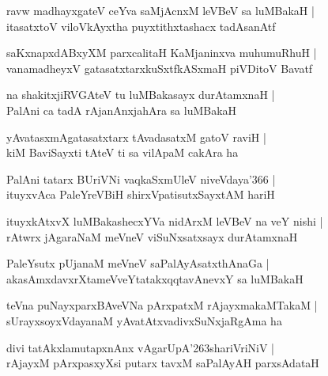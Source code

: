 \documentclass[twoside,12pt,openright]{book}
\def\S{\char'263}
\newcounter{shloka}[chapter]
\begin{document}
\begin{shloka}%
ravw madhayxgateV ceYva saMjAcnxM leVBeV sa luMBakaH |\\
itasatxtoV viloVkAyxtha puyxtithxtashacx tadAsanAtf
\end{shloka}

\begin{shloka}%
saKxnapxdABxyXM parxcalitaH KaMjaninxva muhumuRhuH |\\
vanamadheyxV gatasatxtarxkuSxtfkASxmaH piVDitoV Bavatf
\end{shloka}

\begin{shloka}%
na shakitxjiRVGAteV tu luMBakasayx durAtamxnaH |\\
PalAni ca tadA rAjanAnxjahAra sa luMBakaH
\end{shloka}

\begin{shloka}%
yAvatasxmAgatasatxtarx tAvadasatxM gatoV raviH |\\
kiM BaviSayxti tAteV ti sa vilApaM cakAra ha
\end{shloka}

\begin{shloka}%
PalAni tatarx BUriVNi vaqkaSxmUleV niveVdaya\char'366 |\\
ituyxvAca PaleYreVBiH shirxVpatisutxSayxtAM hariH 
\end{shloka}

\begin{shloka}%
ituyxkAtxvX luMBakashecxYVa nidArxM leVBeV na veY nishi |\\
rAtwrx jAgaraNaM meVneV viSuNxsatxsayx durAtamxnaH 
\end{shloka}

\begin{shloka}%
PaleYsutx pUjanaM meVneV saPalAyAsatxthAnaGa |\\
akasAmxdavxrXtameVveYtatakxqqtavAnevxY sa luMBakaH
\end{shloka}

\begin{shloka}%
teVna puNayxparxBAveVNa pArxpatxM rAjayxmakaMTakaM |\\
sUrayxsoyxVdayanaM yAvatAtxvadivxSuNxjaRgAma ha
\end{shloka}

\begin{shloka}%
divi tatAkxlamutapxnAnx vAgarUpA\S shariVriNiV |\\
rAjayxM pArxpasxyXsi putarx tavxM saPalAyAH parxsAdataH 
\end{shloka}
\end{document}
